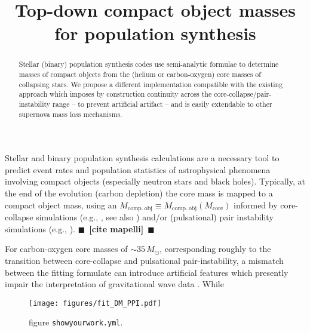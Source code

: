 \documentclass[twocolumn]{aastex63}
\newcommand{\todo}[1]{{\large $\blacksquare$~\textbf{\color{red}[#1]}}~$\blacksquare$}
\begin{document}
\title{Top-down compact object masses for population synthesis}


\begin{abstract}
  Stellar (binary) population synthesis codes use semi-analytic
  formulae to determine masses of compact objects from the (helium or
  carbon-oxygen) core masses of collapsing stars. We propose a
  different implementation compatible with the existing approach which
  imposes by construction continuity across the
  core-collapse/pair-instability range -- to prevent artificial
  artifact -- and is easily extendable to other supernova mass loss
  mechanisms.
\end{abstract}

\section*{}
Stellar and binary population synthesis calculations are a necessary
tool to predict event rates and population statistics of astrophysical
phenomena involving compact objects (especially neutron stars and
black holes). Typically, at the end of the evolution (carbon
depletion) the core mass is mapped to a compact object mass, using an
$M_\mathrm{comp.\ obj}\equiv M_\mathrm{comp.\ obj}(M_\mathrm{core})$
informed by core-collapse simulations (e.g., \citealt{fryer:12,
  spera:15, mandel:20, couch:20}, see also \citealt{zapartas:21}) and/or (pulsational) pair instability simulations
(e.g., \citealt{stevenson:19, marchant:19, farmer:19}). \todo{cite
  mapelli}

For carbon-oxygen core masses of $\sim{}35\,M_\odot$, corresponding
roughly to the transition between core-collapse and pulsational
pair-instability, a mismatch between the fitting formulate can
introduce artificial features which presently impair the
interpretation of gravitational wave data \citep[see e.g. the
corresponding feature in Fig.~5 of][]{vanson:21}.
While

\begin{figure}[ht!]
    \begin{centering}
      \texttt{[image: figures/fit\_DM\_PPI.pdf]}
        \caption{figure \texttt{showyourwork.yml}.}
        \label{fig:fit_DM_PPI}
    \end{centering}
\end{figure}



\end{document}
